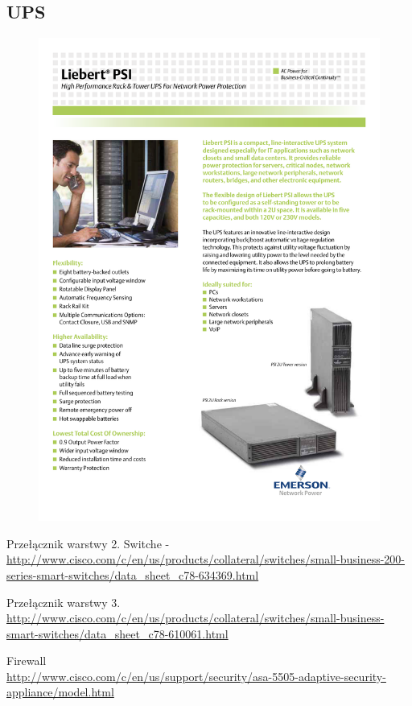 \documentclass[a4paper, 12pt]{article}
\begin{document}
\subsection{UPS}
\begin{figure}[H]
\centering
    \includegraphics[scale=0.80]{spec/ups.pdf}
    \label{fig:PropProf}
\end{figure}

Przełącznik warstwy 2.
Switche - 
\\\url{http://www.cisco.com/c/en/us/products/collateral/switches/small-business-200-series-smart-switches/data_sheet_c78-634369.html}

Przełącznik warstwy 3.
\\\url{http://www.cisco.com/c/en/us/products/collateral/switches/small-business-smart-switches/data_sheet_c78-610061.html}

Firewall
\\\url{http://www.cisco.com/c/en/us/support/security/asa-5505-adaptive-security-appliance/model.html}
\end{document}
